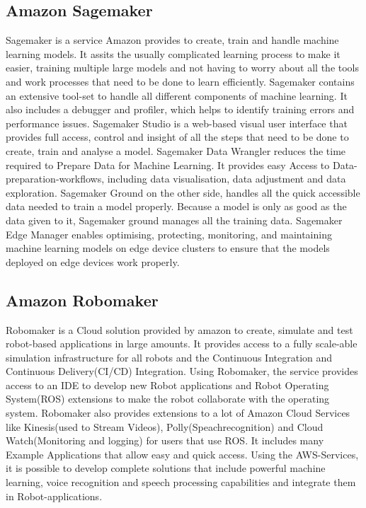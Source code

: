 \subsection{Amazon Sagemaker}
Sagemaker is a service Amazon provides to create, train and handle machine learning models. It assits the usually complicated learning process to make it easier, training multiple large models and not having to worry about all the tools and work processes that need to be done to learn efficiently. Sagemaker contains an extensive tool-set to handle all different components of machine learning. It also includes a debugger and profiler, which helps to identify training errors and performance issues.
\newline Sagemaker Studio is a web-based visual user interface that provides full access, control and insight of all the steps that need to be done to create, train and analyse a model.
\newline Sagemaker Data Wrangler reduces the time required to Prepare Data for Machine Learning. It provides easy Access to Data-preparation-workflows, including data visualisation, data adjustment and data exploration.
\newline Sagemaker Ground on the other side, handles all the quick accessible data needed to train a model properly. Because a model is only as good as the data given to it, Sagemaker ground manages all the training data.
\newline Sagemaker Edge Manager enables optimising, protecting, monitoring, and maintaining machine learning models on edge device clusters to ensure that the models deployed on edge devices work properly.

\subsection{Amazon Robomaker}
Robomaker is a Cloud solution provided by amazon to create, simulate and test robot-based applications in large amounts. It provides access to a fully scale-able simulation infrastructure for all robots and the Continuous Integration and  Continuous Delivery(CI/CD) Integration. Using Robomaker, the service provides access to an IDE to develop new Robot applications and Robot Operating System(ROS) extensions to make the robot collaborate with the operating system. Robomaker also provides extensions to a lot of Amazon Cloud Services like Kinesis(used to Stream Videos), Polly(Speachrecognition) and Cloud Watch(Monitoring and logging) for users that use ROS. It includes many Example Applications that allow easy and quick access. Using the AWS-Services, it is possible to develop complete solutions that include powerful machine learning, voice recognition and speech processing capabilities and integrate them in Robot-applications.

